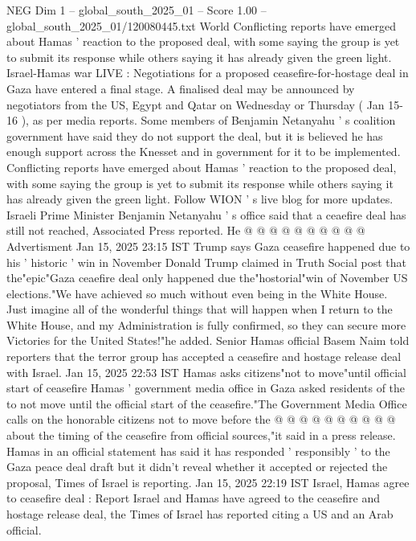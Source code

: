 \begin{textsample}{NEG Dim 1 – global\_south\_2025\_01 – Score 1.00 – global\_south\_2025\_01/120080445.txt}  \label{ex:f1_neg_157}
World Conflicting reports have emerged about Hamas ' reaction to the proposed deal, with some saying the group is yet to submit its response while others saying it has already given the green light.
Israel-Hamas war LIVE : Negotiations for a proposed ceasefire-for-hostage deal in Gaza have entered a final stage.
A finalised deal may be announced by negotiators from the US, Egypt and Qatar on Wednesday or Thursday ( Jan 15-16 ), as per media reports.
Some members of Benjamin Netanyahu ' s coalition government have said they do not support the deal, but it is believed he has enough support across the Knesset and in government for it to be implemented.
Conflicting reports have emerged about Hamas ' reaction to the proposed deal, with some saying the group is yet to submit its response while others saying it has already given the green light.
Follow WION ' s live blog for more updates.
Israeli Prime Minister Benjamin Netanyahu ' s office said that a ceaefire deal has still not reached, Associated Press reported.
He @ @ @ @ @ @ @ @ @ @ Advertisment Jan 15, 2025 23:15 IST Trump says Gaza ceasefire happened due to his ' historic ' win in November Donald Trump claimed in Truth Social post that the"epic"Gaza ceaefire deal only happened due the"hostorial"win of November US elections."We have achieved so much without even being in the White House.
Just imagine all of the wonderful things that will happen when I return to the White House, and my Administration is fully confirmed, so they can secure more Victories for the United States!"he added.
Senior Hamas official Basem Naim told reporters that the terror group has accepted a ceasefire and hostage release deal with Israel.
Jan 15, 2025 22:53 IST Hamas asks citizens"not to move"until official start of ceasefire Hamas ' government media office in Gaza asked residents of the to not move until the official start of the ceasefire."The Government Media Office calls on the honorable citizens not to move before the @ @ @ @ @ @ @ @ @ @ about the timing of the ceasefire from official sources,"it said in a press release.
Hamas in an official statement has said it has responded ' responsibly ' to the Gaza peace deal draft but it didn't reveal whether it accepted or rejected the proposal, Times of Israel is reporting.
Jan 15, 2025 22:19 IST Israel, Hamas agree to ceasefire deal : Report Israel and Hamas have agreed to the ceasefire and hostage release deal, the Times of Israel has reported citing a US and an Arab official.

\end{textsample}
